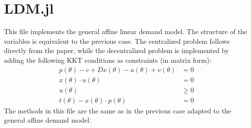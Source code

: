 \documentclass[11pt, oneside]{article}
\begin{document}
\section{LDM.jl}
This file implements the general affine linear demand model. The structure of the variables is equivalent to the previous case. The centralized problem
follows directly from the paper, while the decentralized problem is implemented
by adding the following KKT conditions as constraints (in matrix form):
\[
\begin{split}
    p(\theta) - c + Dx(\theta) - u(\theta) + v(\theta) &= 0 \\
    x(\theta)\cdot u(\theta) &= 0 \\
    u(\theta) & \geq 0 \\
    t(\theta) - x(\theta)\cdot p(\theta) &= 0
\end{split}
\]
The methods in this file are the same as in the previous case adapted to the general affine demand model.
\end{document}
